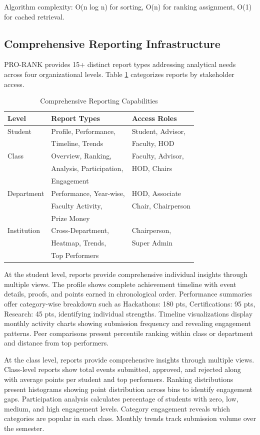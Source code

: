 \documentclass[12pt]{article}
\begin{document}
Algorithm complexity: O(n log n) for sorting, O(n) for ranking assignment, O(1) for cached retrieval.

\subsection{Comprehensive Reporting Infrastructure}
PRO-RANK provides 15+ distinct report types addressing analytical needs across four organizational levels. Table \ref{tab:reports} categorizes reports by stakeholder access.

\begin{table}[t]
\centering
\caption{Comprehensive Reporting Capabilities}
\label{tab:reports}
\begin{tabular}{@{}lll@{}}
\toprule
\textbf{Level} & \textbf{Report Types} & \textbf{Access Roles} \\
\midrule
Student & Profile, Performance, & Student, Advisor, \\
 & Timeline, Trends & Faculty, HOD \\
\midrule
Class & Overview, Ranking, & Faculty, Advisor, \\
 & Analysis, Participation, & HOD, Chairs \\
 & Engagement & \\
\midrule
Department & Performance, Year-wise, & HOD, Associate \\
 & Faculty Activity, & Chair, Chairperson \\
 & Prize Money & \\
\midrule
Institution & Cross-Department, & Chairperson, \\
 & Heatmap, Trends, & Super Admin \\
 & Top Performers & \\
\bottomrule
\end{tabular}
\end{table}

At the student level, reports provide comprehensive individual insights through multiple views. The profile shows complete achievement timeline with event details, proofs, and points earned in chronological order. Performance summaries offer category-wise breakdown such as Hackathons: 180 pts, Certifications: 95 pts, Research: 45 pts, identifying individual strengths. Timeline visualizations display monthly activity charts showing submission frequency and revealing engagement patterns. Peer comparisons present percentile ranking within class or department and distance from top performers.

At the class level, reports provide comprehensive insights through multiple views. Class-level reports show total events submitted, approved, and rejected along with average points per student and top performers. Ranking distributions present histograms showing point distribution across bins to identify engagement gaps. Participation analysis calculates percentage of students with zero, low, medium, and high engagement levels. Category engagement reveals which categories are popular in each class. Monthly trends track submission volume over the semester.
\end{document}
